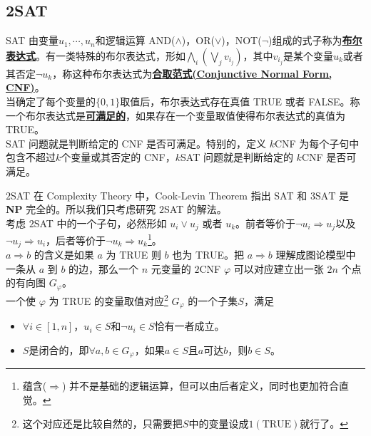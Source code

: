 \documentclass{beamer}
\def\obj#1{\textbf{\uline{#1}}}
\begin{document}
\subsection{2SAT}
\begin{frame}{\textrm{SAT}}
	由变量$u_1, \cdots, u_n$和逻辑运算 \textrm{AND}($\wedge$)，\textrm{OR}($\vee$)，\textrm{NOT}($\lnot$)组成的式子称为\obj{布尔表达式}。有一类特殊的布尔表达式，形如$\bigwedge_i \left(\bigvee_j v_{i_j}\right)$，其中$v_{i_j}$是某个变量$u_k$或者其否定$\lnot u_k$，称这种布尔表达式为\obj{合取范式(Conjunctive Normal Form, CNF)}。\\

	当确定了每个变量的$\{0, 1\}$取值后，布尔表达式存在真值 \textrm{TRUE} 或者 \textrm{FALSE}。称一个布尔表达式是\obj{可满足的}，如果存在一个变量取值使得布尔表达式的真值为 \textrm{TRUE}。\\

	{SAT} 问题就是判断给定的 \textrm{CNF} 是否可满足。特别的，定义 $k$\textrm{CNF} 为每个子句中包含不超过$k$个变量或其否定的 \textrm{CNF}，$k$\textrm{SAT} 问题就是判断给定的 $k$\textrm{CNF} 是否可满足。
\end{frame}
\begin{frame}{$2$\textrm{SAT}}
	在 Complexity Theory 中，Cook-Levin Theorem 指出 \textrm{SAT} 和 $3\mathrm{SAT}$ 是 \textbf{NP} 完全的。所以我们只考虑研究 $2$\textrm{SAT} 的解法。\\

	考虑 $2$\textrm{SAT} 中的一个子句，必然形如 $u_i \vee u_j$ 或者 $u_k$。前者等价于$\lnot u_i \Rightarrow u_j$以及$\lnot u_j \Rightarrow u_i$，后者等价于$\lnot u_k \Rightarrow u_k$\footnote{\tiny 蕴含($\Rightarrow$) 并不是基础的逻辑运算，但可以由后者定义，同时也更加符合直觉。}。\\

	$a \Rightarrow b$ 的含义是如果 $a$ 为 \textrm{TRUE} 则 $b$ 也为 \textrm{TRUE}。把 $a \Rightarrow b$ 理解成图论模型中一条从 $a$ 到 $b$ 的边，那么一个 $n$ 元变量的 $2$\textrm{CNF} $\varphi$ 可以对应建立出一张 $2n$ 个点的有向图 $G_{\varphi}$。\\
	
	一个使 $\varphi$ 为 \textrm{TRUE} 的变量取值对应\footnote{\tiny 这个对应还是比较自然的，只需要把$S$中的变量设成$1(\mathrm{TRUE})$就行了。} $G_{\varphi}$ 的一个子集$S$，满足
	\begin{itemize}
		\item $\forall i \in [1, n]$，$u_i \in S$和$\lnot u_i \in S$恰有一者成立。
		\item $S$是闭合的，即$\forall a, b \in G_{\varphi}$，如果$a \in S$且$a$可达$b$，则$b \in S$。
	\end{itemize}
\end{frame}
\end{document}
